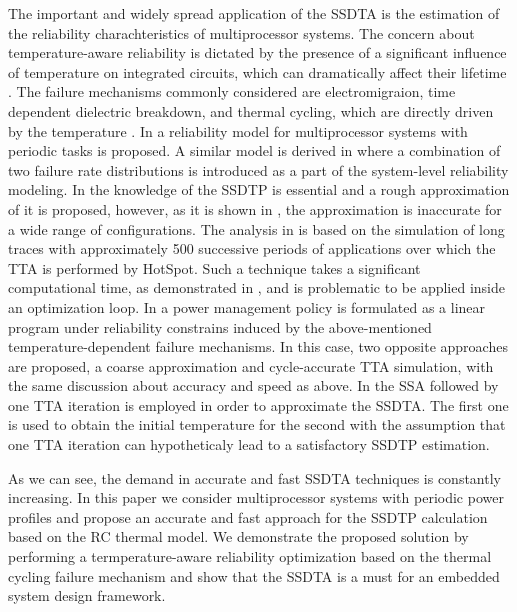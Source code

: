 The important and widely spread application of the SSDTA is the estimation of the reliability charachteristics of multiprocessor systems. The concern about temperature-aware reliability is dictated by the presence of a significant influence of temperature on integrated circuits, which can dramatically affect their lifetime \cite{lu2004, srinivasan2004, jedec2010, hieu2004}. The failure mechanisms commonly considered are electromigraion, time dependent dielectric breakdown, and thermal cycling, which are directly driven by the temperature \cite{jedec2010}. In \cite{huang2009} a reliability model for multiprocessor systems with periodic tasks is proposed. A similar model is derived in \cite{xiang2010} where a combination of two failure rate distributions is introduced as a part of the system-level reliability modeling. In \cite{huang2009} the knowledge of the SSDTP is essential and a rough approximation of it is proposed, however, as it is shown in , the approximation is inaccurate for a wide range of configurations. The analysis in \cite{xiang2010} is based on the simulation of long traces with approximately 500 successive periods of applications over which the TTA is performed by HotSpot. Such a technique takes a significant computational time, as demonstrated in , and is problematic to be applied inside an optimization loop. In \cite{coskun2006} a power management policy is formulated as a linear program under reliability constrains induced by the above-mentioned temperature-dependent failure mechanisms. In this case, two opposite approaches are proposed, a coarse approximation and cycle-accurate TTA simulation, with the same discussion about accuracy and speed as above. In \cite{srinivasan2004} the SSA followed by one TTA iteration is employed in order to approximate the SSDTA. The first one is used to obtain the initial temperature for the second with the assumption that one TTA iteration can hypotheticaly lead to a satisfactory SSDTP estimation.

As we can see, the demand in accurate and fast SSDTA techniques is constantly increasing. In this paper we consider multiprocessor systems with periodic power profiles and propose an accurate and fast approach for the SSDTP calculation based on the RC thermal model. We demonstrate the proposed solution by performing a termperature-aware reliability optimization based on the thermal cycling failure mechanism and show that the SSDTA is a must for an embedded system design framework.

